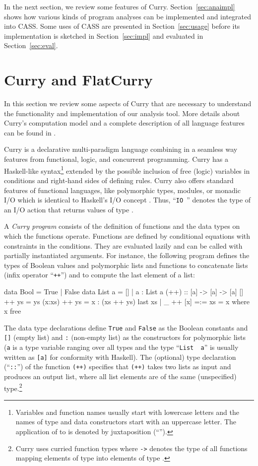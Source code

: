 \documentclass{llncs}
\newcommand{\code}[1]{\mbox{\small\texttt{#1}}}
\newcommand{\ccode}[1]{``\code{#1}''}
\begin{document}
In the next section, we review some features of Curry.
Section~\ref{sec:anaimpl} shows how various kinds of program analyses
can be implemented and integrated into CASS.
Some uses of CASS are presented in Section~\ref{sec:usage}
before its implementation is sketched in Section~\ref{sec:impl}
and evaluated in Section~\ref{sec:eval}.


\section{Curry and FlatCurry}
\label{sec:flatcurry}

In this section we review some aspects of Curry
that are necessary to understand the functionality and
implementation of our analysis tool.
More details about Curry's computation model and a complete
description of all language features can be found in
\cite{Hanus97POPL,Hanus12Curry}.

Curry is a declarative multi-paradigm language
combining in a seamless way features from functional,
logic, and concurrent programming.
Curry has a Haskell-like syntax\footnote{Variables and function names usually
start with lowercase letters and the names of type and data constructors
start with an uppercase letter. The application of 
to  is denoted by juxtaposition (``'').}
\cite{PeytonJones03Haskell}
extended by the possible inclusion of free (logic)
variables in conditions and right-hand sides of defining rules.
Curry also offers standard features of
functional languages, like polymorphic types, modules, or monadic I/O
which is identical to Haskell's I/O concept \cite{Wadler97}.
Thus, \ccode{IO } denotes the type of an I/O action that returns values
of type .

A \emph{Curry program} consists of the definition of functions
and the data types on which the functions operate.
Functions are defined by conditional equations with constraints in the
conditions.  They are evaluated lazily and can be called with
partially instantiated arguments.
For instance, the following program defines the types of
Boolean values and polymorphic lists
and functions to concatenate lists (infix operator \ccode{++})
and to compute the last element of a list:
\begin{curry}
data Bool   = True | False
data List a = []   | a : List a
(++) :: [a] -> [a] -> [a]
[]     ++ ys = ys
(x:xs) ++ ys = x : (xs ++ ys)
last xs | _ ++ [x] =:= xs  = x  where x free
\end{curry}
The data type declarations define
\code{True} and \code{False} as the Boolean constants and
\code{[]} (empty list) and \code{:} (non-empty list) as the constructors for
polymorphic lists (\code{a} is a type variable ranging over
all types and the type \ccode{List\,\,a} is usually written as \code{[a]}
for conformity with Haskell).
The (optional) type declaration (\ccode{::}) of the function \code{(++)}
specifies that \code{(++)} takes two lists as input and produces
an output list, where all list elements are of the same
(unspecified) type.\footnote{Curry uses curried function types
where \code{->} denotes the type of all functions
mapping elements of type  into elements of type .}
\end{document}
